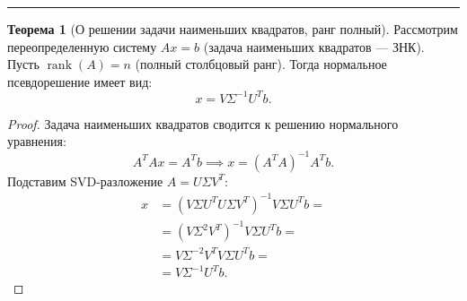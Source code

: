 \documentclass[12pt, a4paper]{article}
\theoremstyle{definition}
\newtheorem{theorem}{Теорема}
\begin{document}
\hrule\vspace{0.5cm}

\begin{theorem}[О решении задачи наименьших квадратов, ранг полный]
Рассмотрим переопределенную систему $Ax = b$ (задача наименьших квадратов --- ЗНК). Пусть $\operatorname{rank}(A) = n$ (полный столбцовый ранг).
Тогда нормальное псевдорешение имеет вид:
\[
x = V \Sigma^{-1} U^T b.
\]
\end{theorem}
\begin{proof}
Задача наименьших квадратов сводится к решению нормального уравнения:
\[
A^T A x = A^T b \implies x = (A^T A)^{-1} A^T b.
\]
Подставим SVD-разложение $A = U \Sigma V^T$:
\begin{align*}
x &= (V \Sigma U^T U \Sigma V^T)^{-1} V \Sigma U^T b = \\
  &= (V \Sigma^2 V^T)^{-1} V \Sigma U^T b = \\
  &= V \Sigma^{-2} V^T V \Sigma U^T b = \\
  &= V \Sigma^{-1} U^T b.
\end{align*}
\end{proof}
\end{document}
